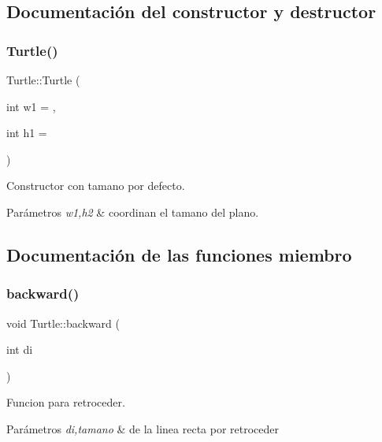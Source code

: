 \subsection{Documentación del constructor y destructor}
\mbox{\label{classTurtle_a0a42aeefa221e7a0598e0af222214788}} 
\subsubsection{\texorpdfstring{Turtle()}{Turtle()}}
{\footnotesize\ttfamily Turtle\+::\+Turtle (\begin{DoxyParamCaption}\item[{int}]{w1 = {},  }\item[{int}]{h1 = {} }\end{DoxyParamCaption})}

Constructor con tamano por defecto. 
\begin{DoxyParams}{Parámetros}
{\em w1,h2} & coordinan el tamano del plano. \\
\hline
\end{DoxyParams}


\subsection{Documentación de las funciones miembro}
\mbox{\label{classTurtle_a0cd2bf8afff89d89662f296dc781bb79}} 
\subsubsection{\texorpdfstring{backward()}{backward()}}
{\footnotesize\ttfamily void Turtle\+::backward (\begin{DoxyParamCaption}\item[{int}]{di }\end{DoxyParamCaption})}

Funcion para retroceder. 
\begin{DoxyParams}{Parámetros}
{\em di,tamano} & de la linea recta por retroceder \\
\hline
\end{DoxyParams}
\mbox{\label{classTurtle_ad065d9fd92fa5eaee2b808f52c444838}} 
